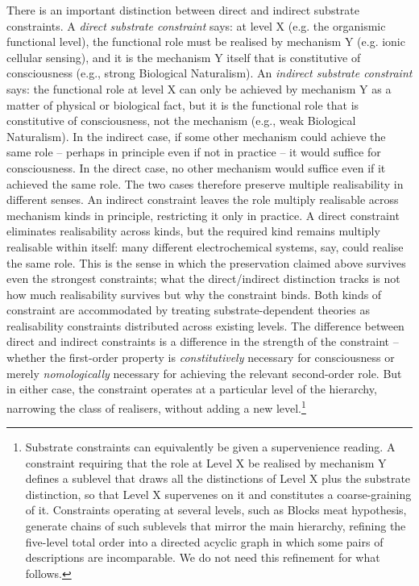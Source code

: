 \documentclass[11pt, a4paper, onecolumn, gdm]{google}
\begin{document}
There is an important distinction between direct and indirect substrate constraints.
A \emph{direct} \emph{substrate constraint} says: at level X (e.g. the organismic functional level), the functional role must be realised by mechanism Y (e.g. ionic cellular sensing), and it is the mechanism Y itself that is constitutive of consciousness (e.g., strong Biological Naturalism).
An \emph{indirect substrate constraint} says: the functional role at level X can only be achieved by mechanism Y as a matter of physical or biological fact, but it is the functional role that is constitutive of consciousness, not the mechanism (e.g., weak Biological Naturalism).
In the indirect case, if some other mechanism could achieve the same role -- perhaps in principle even if not in practice -- it would suffice for consciousness.
In the direct case, no other mechanism would suffice even if it achieved the same role.
The two cases therefore preserve multiple realisability in different senses.
An indirect constraint leaves the role multiply realisable across mechanism kinds in principle, restricting it only in practice.
A direct constraint eliminates realisability across kinds, but the required kind remains multiply realisable within itself: many different electrochemical systems, say, could realise the same role.
This is the sense in which the preservation claimed above survives even the strongest constraints; what the direct/indirect distinction tracks is not how much realisability survives but why the constraint binds.
Both kinds of constraint are accommodated by treating substrate-dependent theories as realisability constraints distributed across existing levels.
The difference between direct and indirect constraints is a difference in the strength of the constraint -- whether the first-order property is \emph{constitutively} necessary for consciousness or merely \emph{nomologically} necessary for achieving the relevant second-order role.
But in either case, the constraint operates at a particular level of the hierarchy, narrowing the class of realisers, without adding a new level.\footnote{Substrate constraints can equivalently be given a supervenience reading. A constraint requiring that the role at Level X be realised by mechanism Y defines a sublevel that draws all the distinctions of Level X plus the substrate distinction, so that Level X supervenes on it and constitutes a coarse-graining of it. Constraints operating at several levels, such as Block\textquotesingle s meat hypothesis, generate chains of such sublevels that mirror the main hierarchy, refining the five-level total order into a directed acyclic graph in which some pairs of descriptions are incomparable. We do not need this refinement for what follows.}
\end{document}
